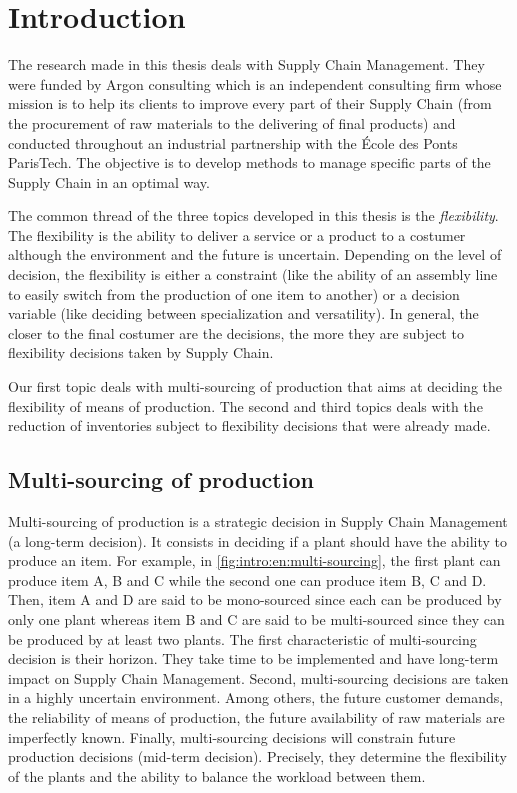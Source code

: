 \chapter{Introduction}
\label{chap:intro:en}


The research made in this thesis deals with Supply Chain Management.
They were funded by Argon consulting which is an independent consulting firm whose mission is to help its clients to improve every part of their Supply Chain (from the procurement of raw materials to the delivering of final products) and conducted throughout an industrial partnership with the \'Ecole des Ponts ParisTech.
The objective is to develop  methods to manage specific parts of the Supply Chain in an optimal way.



The common thread of the three topics developed in this thesis is the \emph{flexibility}.
The flexibility is the ability to deliver a service or a product to a costumer although the environment and the future is uncertain.
Depending on the level of decision, the flexibility is either a constraint (like the ability of an assembly line to easily switch from the production of one item to another) or a decision variable (like deciding between specialization and versatility).
In general, the closer to the final costumer are the decisions, the more they are subject to flexibility decisions taken by Supply Chain.


Our first topic deals with multi-sourcing of production that aims at deciding the flexibility of means of production.
The second and third topics deals with the reduction of inventories subject to flexibility decisions that were already made.

\section{Multi-sourcing of production}
\label{sec:intro:en:multi-sourcing}


Multi-sourcing of production is a strategic decision in Supply Chain Management (\ie a long-term decision).
It consists in deciding if a plant should have the ability to produce an item.
For example, in \cref{fig:intro:en:multi-sourcing}, the first plant can produce item A, B and C while the second one can produce item B, C and D.
Then, item A and D are said to be mono-sourced since each can be produced by only one plant whereas item B and C are said to be multi-sourced since they can be produced by at least two plants.
The first characteristic of multi-sourcing decision is their horizon.
They take time to be implemented and have long-term impact on Supply Chain Management.
Second, multi-sourcing decisions are taken in a highly uncertain environment.
Among others, the future customer demands, the reliability of means of production, the future availability of raw materials are imperfectly known.
Finally, multi-sourcing decisions will constrain future production decisions (\ie mid-term decision).
Precisely, they determine the flexibility of the plants and the ability to balance the workload between them.



